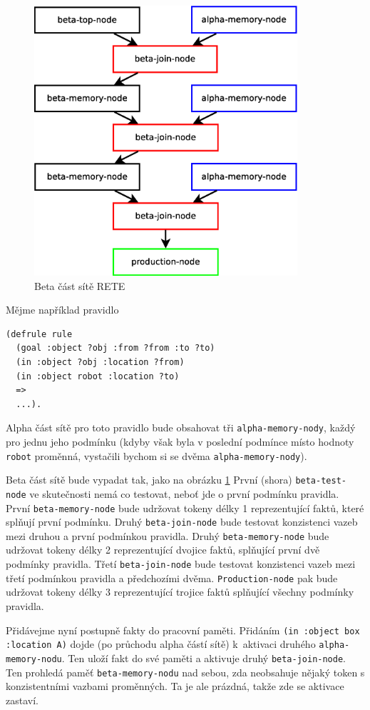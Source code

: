 \begin{figure}[h]
\centering
\includegraphics[height=10cm]{rete-beta.eps}
\caption{Beta část sítě RETE}
\label{rete-beta}
\end{figure}

Mějme například pravidlo
\begin{verbatim}
(defrule rule
  (goal :object ?obj :from ?from :to ?to)
  (in :object ?obj :location ?from)
  (in :object robot :location ?to)
  =>
  ...).
\end{verbatim}
Alpha část sítě pro toto pravidlo bude obsahovat tři \verb|alpha-memory-nody|,
každý pro jednu jeho podmínku (kdyby však byla v poslední podmínce místo hodnoty
\verb|robot| proměnná, vystačili bychom si se dvěma \verb|alpha-memory-nody|).

Beta část sítě bude vypadat tak, jako na obrázku \ref{rete-beta} První (shora)
\verb|beta-test-node| ve skutečnosti nemá co testovat, neboť jde o první
podmínku pravidla. První \verb|beta-memory-node| bude udržovat tokeny délky 1
reprezentující  faktů, které splňují první podmínku. Druhý
\verb|beta-join-node| bude testovat konzistenci vazeb mezi druhou a první
podmínkou pravidla. Druhý \verb|beta-memory-node| bude udržovat tokeny délky 2
reprezentující dvojice faktů, splňující první dvě podmínky pravidla. Třetí
\verb|beta-join-node| bude testovat konzistenci vazeb mezi třetí podmínkou
pravidla a předchozími dvěma. \verb|Production-node| pak bude udržovat tokeny
délky 3 reprezentující trojice faktů splňující všechny podmínky pravidla.

Přidávejme nyní postupně fakty do pracovní paměti. Přidáním
\verb|(in :object box :location A)| dojde (po průchodu alpha částí sítě)
k~aktivaci druhého \verb|alpha-memory-nodu|. Ten uloží fakt do své paměti a
aktivuje  druhý \verb|beta-join-node|. Ten prohledá paměť
\verb|beta-memory-nodu| nad sebou, zda neobsahuje nějaký token s konzistentními
vazbami proměnných. Ta je ale prázdná, takže zde se aktivace zastaví.

